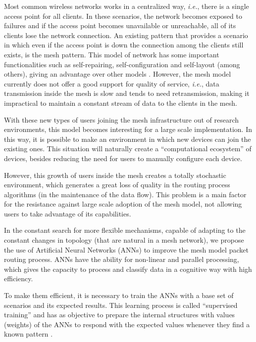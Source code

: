 \documentclass[10pt, conference, compsocconf]{IEEEtran}
\begin{document}

Most common wireless networks works in a centralized way, \textit{i.e.}, there is a single access point for all clients. In these scenarios, the network becomes exposed to failures and if the access point becomes unavailable or unreachable, all of its clients lose the network connection. An existing pattern that provides a scenario in which even if the access point is down the connection among the clients still exists, is the mesh pattern. This model of network has some important functionalities such as self-repairing, self-configuration and self-layout (among others), giving an advantage over other models \cite{Akyildiz:1509968}.
However, the mesh model currently does not offer a good support for quality of service, \textit{i.e.}, data transmission inside the mesh is slow and tends to need retransmission, making it impractical to maintain a constant stream of data to the clients in the mesh.

With these new types of users joining the mesh infrastructure out of research environments, this model becomes interesting for a large scale implementation. In this way, it is possible to make an environment in which new devices can join the existing ones. This situation will naturally create a ``computational ecosystem'' of devices, besides reducing the need for users to manually configure each device.

However, this growth of users inside the mesh creates a totally stochastic environment, which generates a great loss of quality in the routing process algorithms (in the maintenance of the data flow). This problem is a main factor for the resistance against large scale adoption of the mesh model, not allowing users to take advantage of its capabilities.



In the constant search for more flexible mechanisms, capable of adapting to the constant changes in topology (that are natural in a mesh network), we propose the use of Artificial Neural Networks (ANNs) to improve the mesh model packet routing process. ANNs have the ability for non-linear and parallel processing, which gives the capacity to process and classify data in a cognitive way with high efficiency.

To make them efficient, it is necessary to train the ANNs with a base set of scenarios and its expected results. This learning process is called ``supervised training'' and has as objective to prepare the internal structures with values (weights) of the ANNs to respond with the expected values whenever they find a known pattern \cite{Claudio:1996}.
\end{document}
